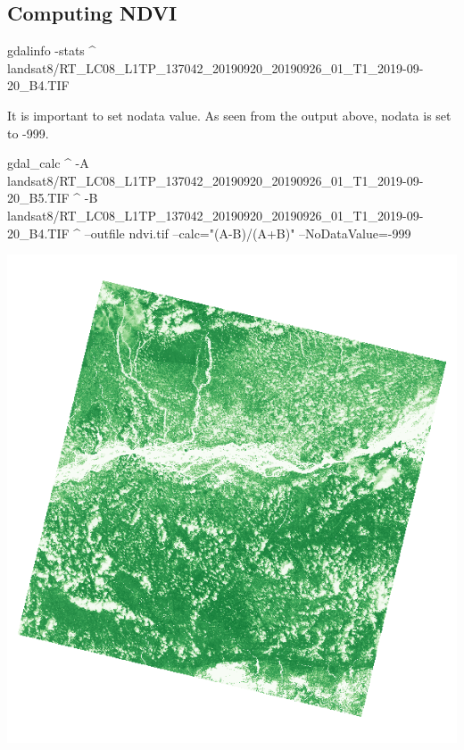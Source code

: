 \documentclass[12pt,a4paper]{article}
\newenvironment{Shaded}{\begin{snugshade}}{\end{snugshade}}
\newcommand{\ExtensionTok}[1]{#1}
\newcommand{\NormalTok}[1]{#1}
\newcommand{\StringTok}[1]{\textcolor[rgb]{0.31,0.60,0.02}{#1}}
\begin{document}
\hypertarget{computing-ndvi}{%
\subsection{Computing NDVI}\label{computing-ndvi}}

\begin{Shaded}
\begin{Highlighting}[]
\ExtensionTok{gdalinfo}\NormalTok{ -stats ^}
  \ExtensionTok{landsat8/RT_LC08_L1TP_137042_20190920_20190926_01_T1_2019-09-20_B4.TIF}
\end{Highlighting}
\end{Shaded}

It is important to set nodata value. As seen from the output above,
nodata is set to -999.

\begin{Shaded}
\begin{Highlighting}[]
\ExtensionTok{gdal_calc}\NormalTok{ ^}
  \ExtensionTok{-A}\NormalTok{ landsat8/RT_LC08_L1TP_137042_20190920_20190926_01_T1_2019-09-20_B5.TIF ^}
  \ExtensionTok{-B}\NormalTok{ landsat8/RT_LC08_L1TP_137042_20190920_20190926_01_T1_2019-09-20_B4.TIF ^}
  \ExtensionTok{--outfile}\NormalTok{ ndvi.tif --calc=}\StringTok{"(A-B)/(A+B)"}\NormalTok{ --NoDataValue=-999}
\end{Highlighting}
\end{Shaded}

\begin{center}\includegraphics{images/gdal/ndvi} \end{center}
\end{document}
